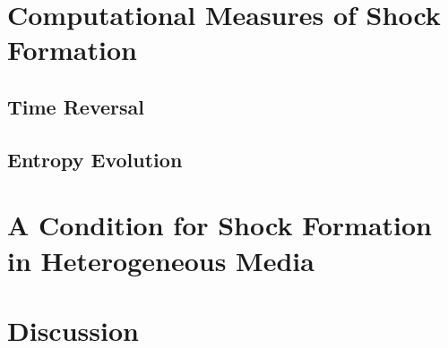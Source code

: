 \documentclass{article}
\begin{document}
%  

\section{Computational Measures of Shock Formation\label{measures}}
  
  \subsection{Time Reversal}
    
  \subsection{Entropy Evolution}
    

\section{A Condition for Shock Formation in Heterogeneous Media\label{criterion}}
    

\section{Discussion\label{discussion}}
  


\end{document}

